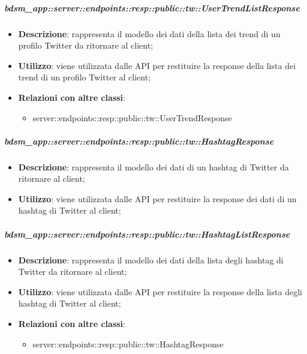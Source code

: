     \subparagraph{bdsm\_app::server::endpoints::resp::public::tw::UserTrendListResponse} %
    \label{subp:bdsm_app_server_endpoints_resp_public_tw_usertrendlistresponse}
    \begin{itemize}
      \item \textbf{Descrizione}: rappresenta il modello dei dati della lista dei trend di un profilo Twitter da ritornare al client;
      \item \textbf{Utilizzo}: viene utilizzata dalle API per restituire la response della lista dei trend di un profilo Twitter al client;
      \item \textbf{Relazioni con altre classi}:
        \begin{itemize}
          \item server::endpoints::resp::public::tw::UserTrendResponse
        \end{itemize}
      \end{itemize}

    \subparagraph{bdsm\_app::server::endpoints::resp::public::tw::HashtagResponse} %
    \label{subp:bdsm_app_server_endpoints_resp_public_tw_hashtagresponse}
    \begin{itemize}
      \item \textbf{Descrizione}: rappresenta il modello dei dati di un hashtag di Twitter da ritornare al client;
      \item \textbf{Utilizzo}: viene utilizzata dalle API per restituire la response dei dati di un hashtag di Twitter al client;
      \end{itemize}

    \subparagraph{bdsm\_app::server::endpoints::resp::public::tw::HashtagListResponse} %
    \label{subp:bdsm_app_server_endpoints_resp_public_tw_hashtaglistresponse}
    \begin{itemize}
      \item \textbf{Descrizione}: rappresenta il modello dei dati della lista degli hashtag di Twitter da ritornare al client;
      \item \textbf{Utilizzo}: viene utilizzata dalle API per restituire la response della lista degli hashtag di Twitter al client;
      \item \textbf{Relazioni con altre classi}:
        \begin{itemize}
          \item server::endpoints::resp::public::tw::HashtagResponse
        \end{itemize}
      \end{itemize}

